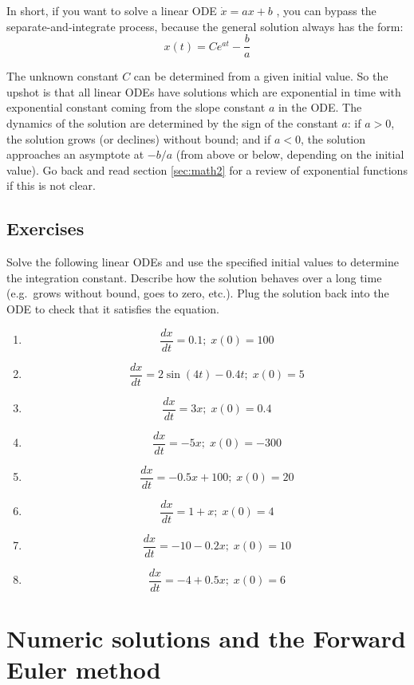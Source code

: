 \documentclass[
  letterpaper,
  DIV=11,
  numbers=noendperiod]{scrreprt}
\begin{document}
In short, if you want to solve a linear ODE \(\dot x= ax +b\) , you can
bypass the separate-and-integrate process, because the general solution
always has the form: \begin{equation}
x(t) = Ce^{at} - \frac{b}{a}
\label{eq:ch15_ode_sol}
\end{equation}

The unknown constant \(C\) can be determined from a given initial value.
So the upshot is that all linear ODEs have solutions which are
exponential in time with exponential constant coming from the slope
constant \(a\) in the ODE. The dynamics of the solution are determined
by the sign of the constant \(a\): if \(a>0\), the solution grows (or
declines) without bound; and if \(a<0\), the solution approaches an
asymptote at \(-b/a\) (from above or below, depending on the initial
value). Go back and read section \ref{sec:math2} for a review of
exponential functions if this is not clear.

\hypertarget{exercises-23}{%
\subsection{Exercises}\label{exercises-23}}

Solve the following linear ODEs and use the specified initial values to
determine the integration constant. Describe how the solution behaves
over a long time (e.g.~grows without bound, goes to zero, etc.). Plug
the solution back into the ODE to check that it satisfies the equation.

\begin{enumerate}
\def\labelenumi{\arabic{enumi}.}
\item
  \[ \frac{dx}{dt} = 0.1; \; x(0)= 100 \]
\item
  \[ \frac{dx}{dt} =  2\sin(4t) -0.4t; \; x(0)= 5 \]
\item
  \[ \frac{dx}{dt} = 3x; \; x(0) = 0.4 \]
\item
  \[ \frac{dx}{dt} = -5x; \;  x(0) = -300 \]
\item
  \[ \frac{dx}{dt} = -0.5x + 100 ; \; x(0) = 20 \]
\item
  \[ \frac{dx}{dt} =  1 + x; \; x(0) = 4 \]
\item
  \[ \frac{dx}{dt} =  -10 - 0.2x; \; x(0) = 10 \]
\item
  \[ \frac{dx}{dt} =  -4 + 0.5x; \; x(0) = 6 \]
\end{enumerate}

\hypertarget{numeric-solutions-and-the-forward-euler-method}{%
\section{Numeric solutions and the Forward Euler
method}\label{numeric-solutions-and-the-forward-euler-method}}
\end{document}
